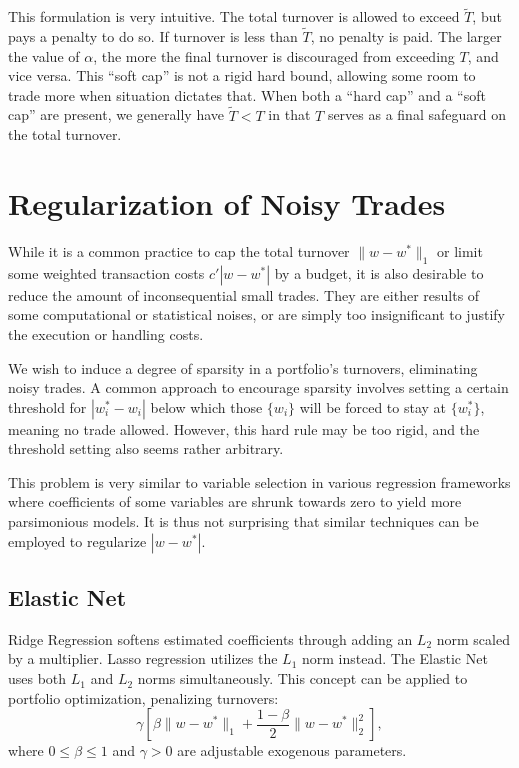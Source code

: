 \documentclass[11pt, letterpaper]{article}
\begin{document}
This formulation is very intuitive. The total turnover is allowed to exceed $\tilde{T}$, but pays a penalty to do so. If
turnover is less than $\tilde{T}$, no penalty is paid. The larger the value of $\alpha$, the more the final turnover is
discouraged from exceeding $T$, and vice versa. This ``soft cap'' is not a rigid hard bound, allowing some room to trade more
when situation dictates that. When both a ``hard cap'' and a ``soft cap'' are present, we generally have $\tilde{T} < T$ in
that $T$ serves as a final safeguard on the total turnover.

\section{Regularization of Noisy Trades}

While it is a common practice to cap the total turnover $\lVert w - w^*\rVert_1$ or limit some weighted transaction costs
$c' |w - w^*|$ by a budget, it is also desirable to reduce the amount of inconsequential small trades. They are either
results of some computational or statistical noises, or are simply too insignificant to justify the execution or handling
costs.

We wish to induce a degree of sparsity in a portfolio's turnovers, eliminating noisy trades. A common approach to encourage
sparsity involves setting a certain threshold for $\left |w^*_i - w_i \right|$ below which those $\{w_i\}$ will be forced to
stay at $\{w_i^*\}$, meaning no trade allowed. However, this hard rule may be too rigid, and the threshold setting also seems
rather arbitrary.

This problem is very similar to variable selection in various regression frameworks where coefficients of some variables are
shrunk towards zero to yield more parsimonious models. It is thus not surprising that similar techniques can be employed to
regularize $|w - w^*|$.
\subsection{Elastic Net}

Ridge Regression \cite{hoerl1970ridge} softens estimated coefficients through adding an $L_2$ norm scaled by a multiplier. Lasso
regression \cite{tibshirani1996lasso} utilizes the $L_1$ norm instead. The Elastic Net \cite{zou2005elasticnet} uses both $L_1$
and $L_2$ norms simultaneously. This concept can be applied to portfolio optimization, penalizing turnovers:
\begin{equation}
	\label{elastic_net_objective}
	\gamma\left[\beta \lVert w-w^*\rVert_1 + \frac{1 - \beta}{2} \lVert w-w^*\rVert_2^2\right],
\end{equation}
where $0 \leq \beta \leq 1$ and $\gamma > 0$ are adjustable exogenous parameters.
\end{document}
